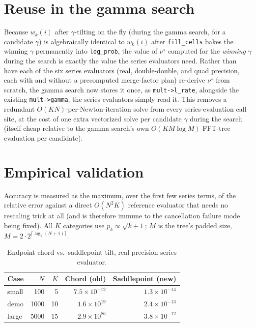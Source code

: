 \documentclass[11pt]{article}
\begin{document}
\section{Reuse in the gamma search}
\label{sec:reuse}

Because $w_k(i)$ after $\gamma$-tilting on the fly (during the gamma search, for a
candidate $\gamma$) is algebraically identical to $w_k(i)$ after \texttt{fill\_cells}
bakes the winning $\gamma$ permanently into \texttt{log\_prob}, the value of $\nu^\star$
computed for the \emph{winning} $\gamma$ during the search is exactly the value the
series evaluators need. Rather than have each of the six series evaluators (real,
double-double, and quad precision, each with and without a precomputed merge-factor
plan) re-derive $\nu^\star$ from scratch, the gamma search now stores it once, as
\texttt{mult->l\_rate}, alongside the existing \texttt{mult->gamma}; the series
evaluators simply read it. This removes a redundant $O(K N)$-per-Newton-iteration solve
from every series-evaluation call site, at the cost of one extra vectorized solve per
candidate $\gamma$ during the search (itself cheap relative to the gamma search's own
$O(KM\log M)$ FFT-tree evaluation per candidate).

\section{Empirical validation}
\label{sec:validation}

Accuracy is measured as the maximum, over the first few series terms, of the relative
error against a direct $O(N^2K)$ reference evaluator that needs no rescaling trick at
all (and is therefore immune to the cancellation failure mode being fixed). All
$K$ categories use $p_k \propto \sqrt{k+1}$; $M$ is the tree's padded size,
$M = 2\cdot 2^{\lceil\log_2(N+1)\rceil}$.

\begin{table}[h]
\centering
\caption{Endpoint chord vs.\ saddlepoint tilt, real-precision series evaluator.}
\label{tab:chord-vs-saddlepoint}
\begin{tabular}{@{}lrrrr@{}}
\toprule
Case & $N$ & $K$ & Chord (old) & Saddlepoint (new) \\
\midrule
small  & 100  & 5  & $7.5\times 10^{-12}$ & $1.3\times 10^{-14}$ \\
demo   & 1000 & 10 & $1.6\times 10^{19}$  & $2.4\times 10^{-13}$ \\
large  & 5000 & 15 & $2.9\times 10^{86}$  & $3.8\times 10^{-12}$ \\
\bottomrule
\end{tabular}
\end{table}
\end{document}
